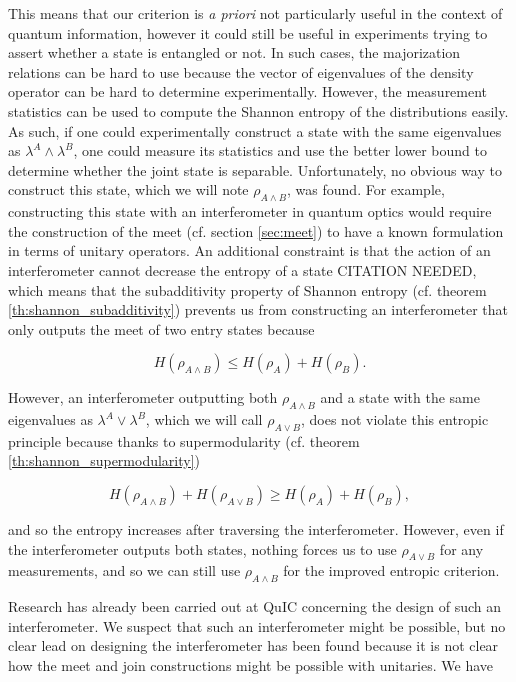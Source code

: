 This means that our criterion is \textit{a priori} not particularly useful in the context of quantum information, however it could still be useful in experiments trying to assert whether a state is entangled or not. In such cases, the majorization relations can be hard to use because the vector of eigenvalues of the density operator can be hard to determine experimentally. However, the measurement statistics can be used to compute the Shannon entropy of the distributions easily. As such, if one could experimentally construct a state with the same eigenvalues as $\lambda^A \wedge \lambda^B$, one could measure its statistics and use the better lower bound to determine whether the joint state is separable. Unfortunately, no obvious way to construct this state, which we will note $\rho_{A \wedge B}$, was found. For example, constructing this state with an interferometer in quantum optics would require the construction of the meet (cf. section \ref{sec:meet}) to have a known formulation in terms of unitary operators. An additional constraint is that the action of an interferometer cannot decrease the entropy of a state CITATION NEEDED, which means that the subadditivity property of Shannon entropy (cf. theorem \ref{th:shannon_subadditivity}) prevents us from constructing an interferometer that only outputs the meet of two entry states because

\begin{equation}
    H(\rho_{A \wedge B}) \leq H(\rho_A) + H(\rho_B).
\end{equation}

However, an interferometer outputting both $\rho_{A \wedge B}$ and a state with the same eigenvalues as $\lambda^A \vee \lambda^B$, which we will call $\rho_{A \vee B}$, does not violate this entropic principle because thanks to supermodularity (cf. theorem \ref{th:shannon_supermodularity})

\begin{equation}
    H(\rho_{A \wedge B}) + H(\rho_{A \vee B}) \geq H(\rho_A) + H(\rho_B),
\end{equation}

\noindent and so the entropy increases after traversing the interferometer. However, even if the interferometer outputs both states, nothing forces us to use $\rho_{A \vee B}$ for any measurements, and so we can still use $\rho_{A \wedge B}$ for the improved entropic criterion.

Research has already been carried out at QuIC concerning the design of such an interferometer. We suspect that such an interferometer might be possible, but no clear lead on designing the interferometer has been found because it is not clear how the meet and join constructions might be possible with unitaries. We have

